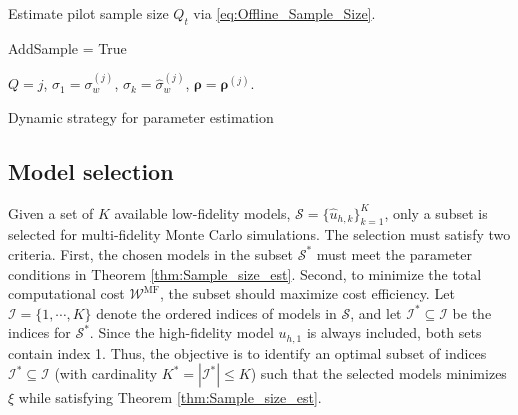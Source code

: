 \begin{algorithm}[!ht]
{{{    }
    }

    Estimate pilot sample size $Q_t$ via \eqref{eq:Offline_Sample_Size}.
    
    {
    AddSample = True
    }
    
    }
    
    
    $Q=j$, $\sigma_1 = \sigma_w^{(j)}$, $\sigma_k = \widehat\sigma_w^{(j)}$, $\boldsymbol{\rho} = \boldsymbol{\rho}^{(j)}$.
\caption{Dynamic strategy for parameter estimation}\label{algo:Parameter_Estimation}
\end{algorithm}
%


\subsection{Model selection}\label{sec:Model_Selection}
Given a set of $K$ available low-fidelity models, $\mathcal{S}=\{\widehat u_{h, k}\}_{k=1}^K$, only a subset is selected for multi-fidelity Monte Carlo simulations. The selection must satisfy two criteria. First, the chosen models in the subset $\mathcal{S}^*$ must meet the parameter conditions in Theorem \ref{thm:Sample_size_est}. Second, to minimize the total computational cost $\mathcal{W}^\text{MF}$, the subset should maximize cost efficiency.  Let $\mathcal{I} = \{1,\cdots,K\}$ denote the ordered indices of models in $\mathcal{S}$, and let $\mathcal{I}^*\subseteq \mathcal{I}$ be the indices for $\mathcal{S}^*$. Since the high-fidelity model $u_{h,1}$ is always included, both sets contain index 1. Thus, the objective is to identify an optimal subset of indices $\mathcal{I}^* \subseteq \mathcal{I}$ (with cardinality $K^*=|\mathcal{I}^*| \leq K$) such that the selected models minimizes $\xi$ while satisfying Theorem \ref{thm:Sample_size_est}.  


